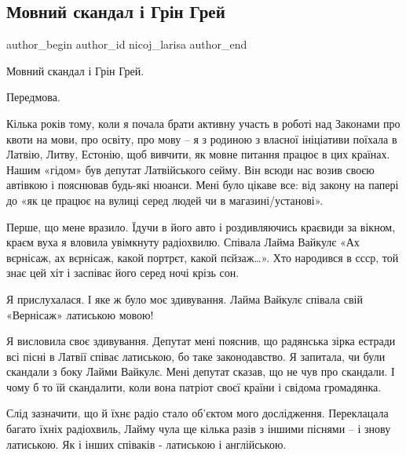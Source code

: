  
 
 
 
 
 
\subsection{Мовний скандал і Грін Грей}
\label{sec:28_07_2021.fb.nicoj_larisa.1.grin_grey_mova}
 
\ifcmt
 author_begin
   author_id nicoj_larisa
 author_end
\fi

Мовний скандал і Грін Грей. 

Передмова.

Кілька років тому, коли я почала брати активну участь в роботі над Законами про
квоти на мови, про освіту, про мову – я з родиною з власної ініціативи поїхала
в Латвію, Литву, Естонію, щоб вивчити, як мовне питання працює в цих країнах.
Нашим «гідом» був депутат Латвійського сейму. Він всюди нас возив своєю
автівкою і пояснював будь-які нюанси. Мені було цікаве все: від закону на
папері до «як це працює на вулиці серед людей чи в магазині/установі».

Перше, що мене вразило. Їдучи в його авто і роздивляючись краєвиди за вікном,
краєм вуха я вловила увімкнуту радіохвилю. Співала Лайма Вайкулє «Ах вєрнісаж,
ах вєрнісаж, какой портрєт, какой пєйзаж…». Хто народився в ссср, той знає цей
хіт і заспіває його серед ночі крізь сон. 

Я прислухалася. І яке ж було моє здивування. Лайма Вайкулє співала свій «Вернісаж» латиською мовою! 

Я висловила своє здивування. Депутат мені пояснив, що радянська зірка естради
всі пісні в Латвії співає латиською, бо таке законодавство. Я запитала, чи були
скандали з боку Лайми Вайкулє. Мені депутат сказав, що не чув про скандали. І
чому б то їй скандалити, коли вона патріот своєї країни і свідома громадянка. 

Слід зазначити, що й їхнє радіо стало об’єктом мого дослідження. Переклацала
багато їхніх радіохвиль, Лайму чула ще кілька разів з іншими піснями – і знову
латиською. Як і інших співаків - латиською і англійською.  

